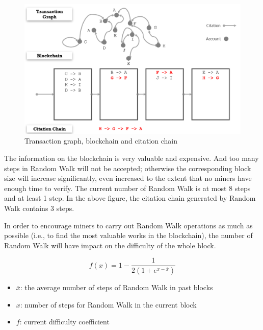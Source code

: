 \documentclass[a4paper,oneside,openany]{tufte-book}
\begin{document}
\begin{figure}
  \includegraphics[width=\textwidth]{fig/citeG.png}
  \caption{Transaction graph, blockchain and citation chain}
\end{figure}



The information on the blockchain is very valuable and expensive. And too many steps in Random Walk will not be accepted; otherwise the corresponding block size will increase significantly, even increased to the extent that no miners have enough time to verify. The current number of Random Walk is at most 8 steps and at least 1 step. In the above figure, the citation chain generated by Random Walk contains 3 steps.


In order to encourage miners to carry out Random Walk operations as much as possible (i.e., to find the most valuable works in the blockchain), the number of Random Walk will have impact on the difficulty of the whole block.


\[
f(x)=1-\frac{1}{2(1+e^{x-\overline{x}})}
\]


\begin{itemize}
  \item $\overline{x}$: the average number of steps of Random Walk in past blocks
  \item $x$: number of steps for Random Walk in the current block
  \item $f$: current difficulty coefficient
\end{itemize}
\end{document}
